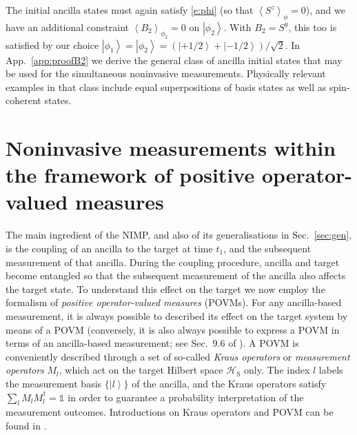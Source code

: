 \documentclass[epjST,numbook]{svjour}
\newcommand{\ket}[1]{\left \vert #1 \right >}
\newcommand{\expval}[1]{\left\langle #1 \right\rangle}
\begin{document}
The initial ancilla states must again satisfy \eqref{e:phi} (so that ${\expval{S^z}_{\phi}=0}$), and we have an additional constraint $\expval{B_2}_{\phi_2}=0$ on $\ket{\phi_2}$. With $B_2=S^y$, this too is satisfied by our choice $\ket{\phi_{1}}=\ket{\phi_2}=(\ket{+1/2}+\ket{-1/2})/\sqrt{2}$. In App.~\ref{app:proofB2} we derive the general class of ancilla initial states that may be used for the simultaneous noninvasive measurements. Physically relevant examples in that class include equal superpositions of basis states as well as spin-coherent states.

\section{Noninvasive measurements within the framework of positive operator-valued measures}
\label{sec:povm}

The main ingredient of the NIMP, and also of its generalisations in Sec.~\ref{sec:gen}, is the coupling of an ancilla to the target at time $t_1$, and the subsequent measurement of that ancilla. %
During the coupling procedure, ancilla and target become entangled so that the subsequent measurement of the ancilla also affects the target state.
To understand this effect on the target we now employ the formalism of \emph{positive operator-valued measures} (POVMs). 
For any ancilla-based measurement, it is always possible to described its effect on the target system by means of a POVM  (conversely, it is also always possible to express a POVM in terms of an ancilla-based measurement; see Sec.~$9.6$ of \cite{AsherPeres}). A POVM is conveniently described through a set of so-called \emph{Kraus operators}\/ or \emph{measurement operators}\/ $M_l$, which act on the target Hilbert space $\mathscr{H}_\text{S}$ only. The index $l$ labels the measurement basis $\{\ket{l}\}$ of the ancilla, and the Kraus operators satisfy $\sum_l M_lM^\dagger_l=\mathds{1}$ in order to guarantee a probability interpretation of the measurement outcomes. Introductions on Kraus operators and POVM can be found in \cite{Jacobs,NielsenChuang,AsherPeres}.
\end{document}

